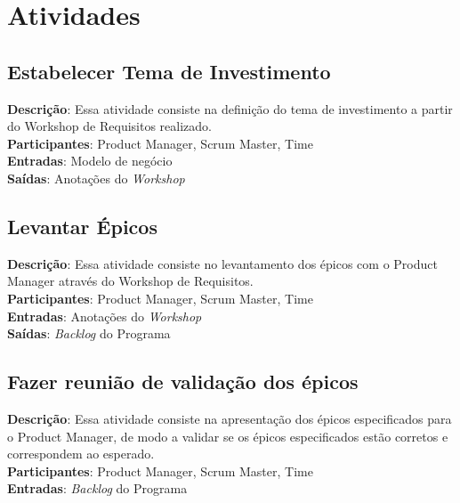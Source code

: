\section{Atividades}

\subsection{Estabelecer Tema de Investimento}

  \textbf{Descrição}: Essa atividade consiste na definição do tema de investimento a partir do Workshop de Requisitos realizado.\\
  
  \textbf{Participantes}: Product Manager, Scrum Master, Time \\
  
  \textbf{Entradas}: Modelo de negócio \\
  
  \textbf{Saídas}: Anotações do \textit{Workshop} \\

\subsection{Levantar Épicos}
  \textbf{Descrição}: Essa atividade consiste no levantamento dos épicos com o Product Manager através do Workshop de Requisitos. \\
  
  \textbf{Participantes}: Product Manager, Scrum Master, Time \\
  
  \textbf{Entradas}: Anotações do \textit{Workshop} \\
  
  \textbf{Saídas}: \textit{Backlog} do Programa \\

\subsection{Fazer reunião de validação dos épicos}
  \textbf{Descrição}: Essa atividade consiste na apresentação dos épicos especificados para o Product Manager, de modo a validar se os épicos 
  especificados estão corretos e correspondem ao esperado. \\
  
  \textbf{Participantes}: Product Manager, Scrum Master, Time \\
  
  \textbf{Entradas}: \textit{Backlog} do Programa \\
  
